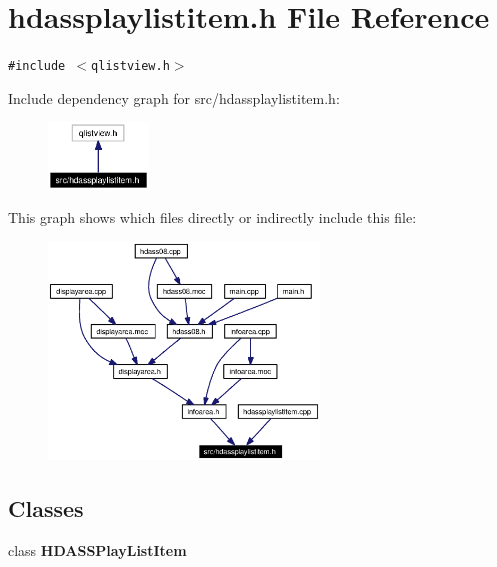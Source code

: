 \section{hdassplaylistitem.h File Reference}
\label{src_2hdassplaylistitem_8h}


{\tt \#include $<$qlistview.h$>$}\par


Include dependency graph for src/hdassplaylistitem.h:\begin{figure}[H]
\begin{center}
\leavevmode
\includegraphics[width=76pt]{src_2hdassplaylistitem_8h__incl}
\end{center}
\end{figure}


This graph shows which files directly or indirectly include this file:\begin{figure}[H]
\begin{center}
\leavevmode
\includegraphics[width=204pt]{src_2hdassplaylistitem_8h__dep__incl}
\end{center}
\end{figure}
\subsection*{Classes}
\begin{CompactItemize}
\item 
class {\bf HDASSPlay\-List\-Item}
\end{CompactItemize}
